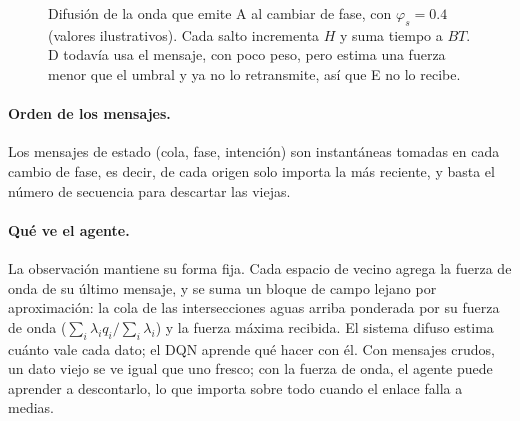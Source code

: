 \documentclass[11pt,letterpaper]{article}
\begin{document}
\begin{figure}[!htbp]
\centering
{}
\caption{Difusión de la onda que emite A al cambiar de fase, con
$\varphi_s=0.4$ (valores ilustrativos). Cada salto incrementa $H$ y suma tiempo a
$BT$. D todavía usa el mensaje, con poco peso, pero estima una fuerza menor que el
umbral y ya no lo retransmite, así que E no lo recibe.}
\label{fig:onda}
\end{figure}

\paragraph{Orden de los mensajes.} Los mensajes de estado (cola, fase, intención) son
instantáneas tomadas en cada cambio de fase, es decir, de cada origen solo importa la más reciente, y basta el número de
secuencia para descartar las viejas.

\paragraph{Qué ve el agente.} La observación mantiene su forma fija. Cada espacio
de vecino agrega la fuerza de onda de su último mensaje, y se suma un bloque de
campo lejano por aproximación: la cola de las intersecciones aguas arriba
ponderada por su fuerza de onda ($\sum_i \lambda_i q_i / \sum_i \lambda_i$) y la
fuerza máxima recibida. El sistema difuso estima cuánto vale cada dato; el DQN
aprende qué hacer con él. Con mensajes crudos, un dato viejo se ve igual que uno
fresco; con la fuerza de onda, el agente puede aprender a descontarlo, lo que
importa sobre todo cuando el enlace falla a medias.
\end{document}
